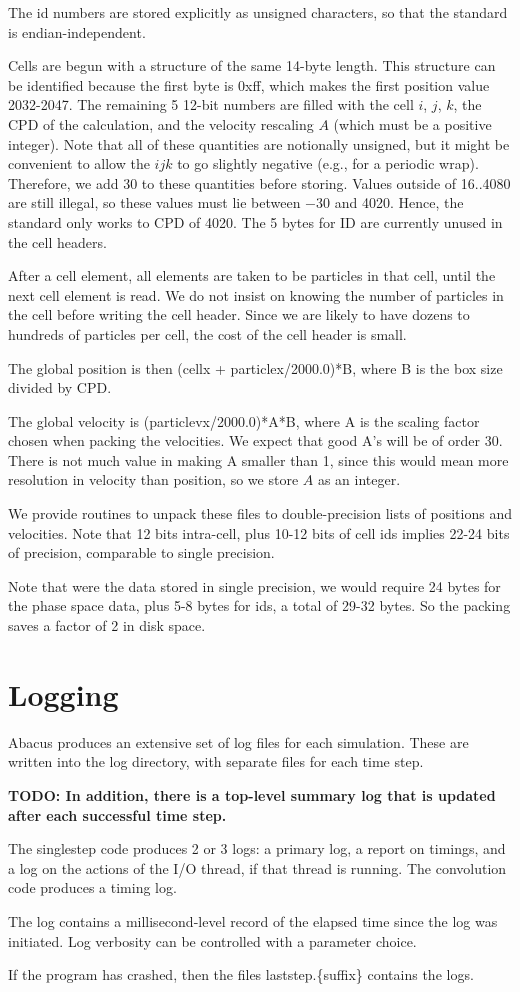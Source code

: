 \documentclass[11pt,preprint]{aastex}
\newcommand{\todo}[1]{{\bf TODO: #1}}
\begin{document}
The id numbers are stored explicitly as unsigned characters, so
that the standard is endian-independent.

Cells are begun with a structure of the same 14-byte length.  This
structure can be identified because the first byte is 0xff, which
makes the first position value 2032-2047.  The remaining 5
12-bit numbers are filled with the cell $i$, $j$, $k$, the CPD 
of the calculation, and the velocity rescaling $A$ (which must be
a positive integer).  Note that all of these quantities are notionally
unsigned, but it might be convenient to allow the  $ijk$ to go slightly
negative (e.g., for a periodic wrap).  Therefore, we add 30 to these
quantities before storing.  Values outside of 16..4080 are still illegal, 
so these values must lie between $-30$ and 4020.  Hence, the standard
only works to CPD of 4020.  The 5 bytes for ID are currently unused
in the cell headers.

After a cell element, all elements are taken to be particles in
that cell, until the next cell element is read.  We do not insist
on knowing the number of particles in the cell before writing the
cell header.  Since we are likely to have dozens to hundreds of
particles per cell, the cost of the cell header is small.

The global position is then (cellx + particlex/2000.0)*B, where B
is the box size divided by CPD.  

The global velocity is (particlevx/2000.0)*A*B, where A is the
scaling factor chosen when packing the velocities.  We expect
that good A's will be of order 30.  There is not much value in 
making A smaller than 1, since this would mean more resolution 
in velocity than position, so we store $A$ as an integer. 

We provide routines to unpack these files to double-precision lists of
positions and velocities.  Note that 12 bits intra-cell, plus 10-12 bits
of cell ids implies 22-24 bits of precision, comparable to single precision.

Note that were the data stored in single precision, we would require
24 bytes for the phase space data, plus 5-8 bytes for ids, a total of 
29-32 bytes.  So the packing saves a factor of 2 in disk space.

\section{Logging}

Abacus produces an extensive set of log files for each simulation.
These are written into the log directory, with separate files for
each time step. 

\todo{In addition, there is a top-level summary log that is updated
after each successful time step.}

The singlestep code produces 2 or 3 logs: a primary log, a report
on timings, and a log on the actions of the I/O thread, if that
thread is running.  The convolution code produces a timing log.

The log contains a millisecond-level record of the elapsed time
since the log was initiated.  Log verbosity can be controlled with
a parameter choice.

If the program has crashed, then the files laststep.\{suffix\} contains
the logs.
\end{document}
